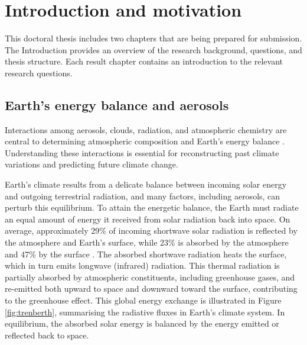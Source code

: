 
\chapter{Introduction and motivation} 
\label{ch1:title}

This doctoral thesis includes two chapters that are being prepared for submission. The Introduction provides an overview of the research background, questions, and thesis structure. Each result chapter contains an introduction to the relevant research questions.

\section{Earth's energy balance and aerosols}

Interactions among aerosols, clouds, radiation, and atmospheric chemistry are central to determining atmospheric composition and Earth's energy balance \citep{forsterEarthEnergyBudget2021}. Understanding these interactions is essential for reconstructing past climate variations and predicting future climate change. 

Earth's climate results from a delicate balance between incoming solar energy and outgoing terrestrial radiation, and many factors, including aerosols, can perturb this equilibrium. To attain the energetic balance, the Earth must radiate an equal amount of energy it received from solar radiation back into space. On average, approximately 29\% of incoming shortwave solar radiation is reflected by the atmosphere and Earth's surface, while 23\% is absorbed by the atmosphere and 47\% by the surface \citep{readGlobalEnergyBudgets2016}. The absorbed shortwave radiation heats the surface, which in turn emits longwave (infrared) radiation. This thermal radiation is partially absorbed by atmospheric constituents, including greenhouse gases, and re-emitted both upward to space and downward toward the surface, contributing to the greenhouse effect. This global energy exchange is illustrated in Figure \ref{fig:trenberth}, summarising the radiative fluxes in Earth's climate system. In equilibrium, the absorbed solar energy is balanced by the energy emitted or reflected back to space.

